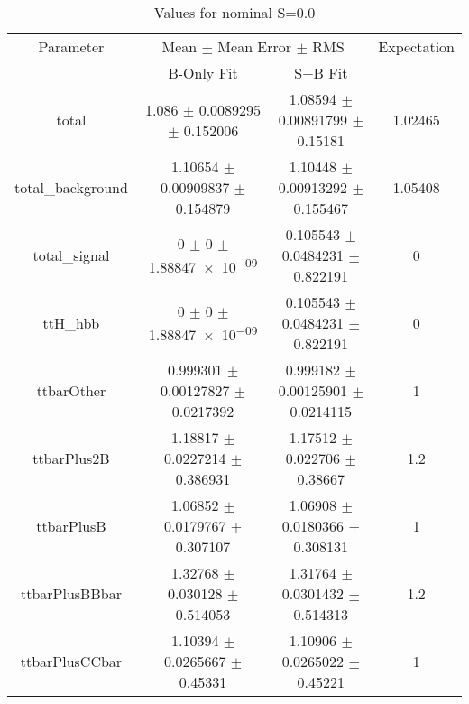 \begin{table}
\centering
\caption{Values for nominal S=0.0}
\begin{tabular}{cccc}
\toprule
Parameter & \multicolumn{2}{c}{Mean $\pm$ Mean Error $\pm$ RMS} & Expectation\\
 & B-Only Fit & S+B Fit & \\
\midrule
total & \num{1.086} $\pm$ \num{0.0089295} $\pm$ \num{0.152006} & \num{1.08594} $\pm$ \num{0.00891799} $\pm$ \num{0.15181} & \num{1.02465}\\
total\_background & \num{1.10654} $\pm$ \num{0.00909837} $\pm$ \num{0.154879} & \num{1.10448} $\pm$ \num{0.00913292} $\pm$ \num{0.155467} & \num{1.05408}\\
total\_signal & \num{0} $\pm$ \num{0} $\pm$ \num{1.88847e-09} & \num{0.105543} $\pm$ \num{0.0484231} $\pm$ \num{0.822191} & \num{0}\\
ttH\_hbb & \num{0} $\pm$ \num{0} $\pm$ \num{1.88847e-09} & \num{0.105543} $\pm$ \num{0.0484231} $\pm$ \num{0.822191} & \num{0}\\
ttbarOther & \num{0.999301} $\pm$ \num{0.00127827} $\pm$ \num{0.0217392} & \num{0.999182} $\pm$ \num{0.00125901} $\pm$ \num{0.0214115} & \num{1}\\
ttbarPlus2B & \num{1.18817} $\pm$ \num{0.0227214} $\pm$ \num{0.386931} & \num{1.17512} $\pm$ \num{0.022706} $\pm$ \num{0.38667} & \num{1.2}\\
ttbarPlusB & \num{1.06852} $\pm$ \num{0.0179767} $\pm$ \num{0.307107} & \num{1.06908} $\pm$ \num{0.0180366} $\pm$ \num{0.308131} & \num{1}\\
ttbarPlusBBbar & \num{1.32768} $\pm$ \num{0.030128} $\pm$ \num{0.514053} & \num{1.31764} $\pm$ \num{0.0301432} $\pm$ \num{0.514313} & \num{1.2}\\
ttbarPlusCCbar & \num{1.10394} $\pm$ \num{0.0265667} $\pm$ \num{0.45331} & \num{1.10906} $\pm$ \num{0.0265022} $\pm$ \num{0.45221} & \num{1}\\
\bottomrule
\end{tabular}
\end{table}